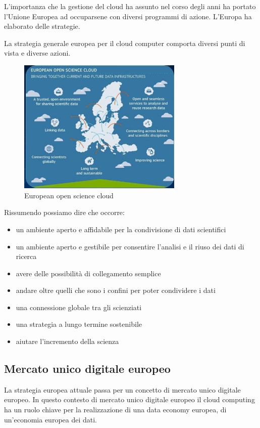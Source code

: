 L'importanza che la gestione del cloud ha assunto nel corso degli anni ha portato l'Unione Europea ad occuparsene con diversi programmi di azione. L'Europa ha elaborato delle strategie. 

La strategia generale europea per il cloud computer comporta diversi punti di vista e diverse azioni. 

\begin{figure}[ht!]
    \centering
    \includegraphics[width=0.7\textwidth]{images/17_lez_fig_04}
    \caption{European open science cloud}
    \label{fig:European}
\end{figure}

Rissumendo possiamo dire che occorre:
\begin{itemize}
    \item un ambiente aperto e affidabile per la condivisione di dati scientifici
    \item un ambiente aperto e gestibile per consentire l'analisi e il riuso dei dati di ricerca
    \item avere delle possibilità di collegamento semplice
    \item andare oltre quelli che sono i confini per poter condividere i dati
    \item una connessione globale tra gli scienziati
    \item una strategia a lungo termine sostenibile
    \item aiutare l'incremento della scienza
\end{itemize}

\subsection{Mercato unico digitale europeo}
La strategia europea attuale passa per un concetto di mercato unico digitale europeo. In questo contesto di mercato unico digitale europeo il cloud computing ha un ruolo chiave per la realizzazione di una data economy europea, di un'economia europea dei dati. 

